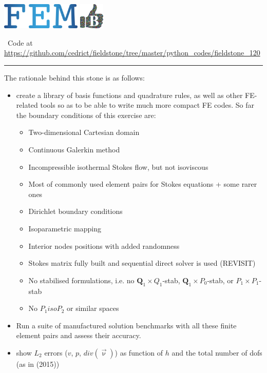 \includegraphics[height=1.25cm]{images/pictograms/FEM}
\includegraphics[height=1.25cm]{images/pictograms/benchmark}

%

\begin{center}
\inpython~Code at \url{https://github.com/cedrict/fieldstone/tree/master/python_codes/fieldstone_120}
\end{center}

\par\noindent\rule{\textwidth}{0.4pt}



The rationale behind this stone is as follows:
\begin{itemize}
\item create a library of basis functions and quadrature rules, as well as 
other FE-related tools so as to be able to write much more compact FE codes. 
So far the boundary conditions of this exercise are:
\begin{itemize}
\item Two-dimensional Cartesian domain
\item Continuous Galerkin method
\item Incompressible isothermal Stokes flow, but not isoviscous
\item Most of commonly used element pairs for Stokes equations + some rarer ones 
\item Dirichlet boundary conditions 
\item Isoparametric mapping 
\item Interior nodes positions with added randomness
\item Stokes matrix fully built and sequential direct solver is used (REVISIT)
\item No stabilised formulations, i.e. no ${\bm Q}_1\times Q_1$-stab, 
      ${\bm Q}_1\times P_0$-stab, or $P_1\times P_1$-stab
\item No $P_1isoP_2$ or similar spaces
\end{itemize}
\item Run a suite of manufactured solution benchmarks with all 
these finite element pairs and assess their accuracy.
\item show $L_2$ errors ($v$, $p$, $div(\vec\upnu)$) as function of $h$ and the 
total number of dofs (as in \textcite{cakp15} (2015))
\end{itemize}

